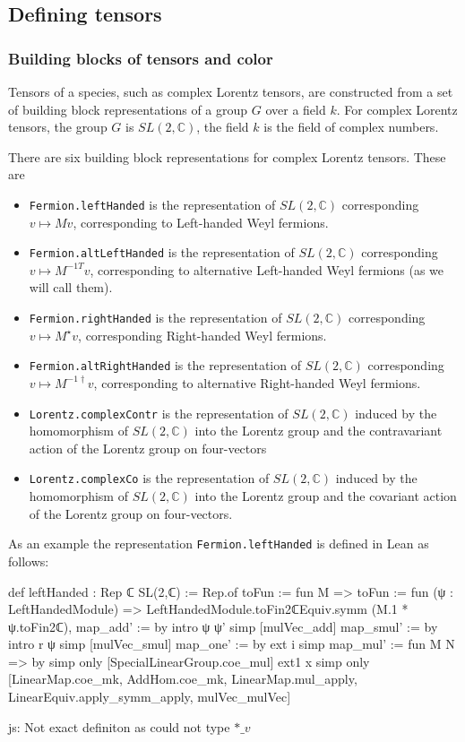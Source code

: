 \documentclass[a4paper, 11pt]{article}
\newcommand{\js}[1]{ {\color{magenta} js:  #1}}
\begin{document}
 \subsection{Defining tensors}

\subsubsection{Building blocks of tensors and color}

Tensors of a species, such as complex Lorentz tensors, are constructed from a 
set of building block representations of a group $G$ over a field $k$.
For complex Lorentz tensors, the group $G$ is $SL(2, \mathbb{C})$, the field $k$ is the 
field of complex numbers. 

There are six building block representations for complex Lorentz tensors. These are
\begin{itemize}
  \item \lstinline|Fermion.leftHanded| is the
   representation of $SL(2, \mathbb{C})$ corresponding 
      $v \mapsto M v$, corresponding to Left-handed Weyl fermions.
  \item \lstinline|Fermion.altLeftHanded| is the
  representation of $SL(2, \mathbb{C})$ corresponding 
     $v \mapsto M^{-1 T} v$, corresponding to alternative Left-handed Weyl fermions (as we will 
     call them).
  \item \lstinline|Fermion.rightHanded| is the representation of $SL(2, \mathbb{C})$ corresponding 
  $v \mapsto M^\star v$, corresponding Right-handed Weyl fermions.
  \item \lstinline|Fermion.altRightHanded| is the representation of $SL(2, \mathbb{C})$ corresponding
  $v \mapsto M^{-1 \dagger} v$, corresponding to alternative Right-handed Weyl fermions.
  \item \lstinline|Lorentz.complexContr| is the representation of $SL(2, \mathbb{C})$ 
   induced by the homomorphism of $SL(2, \mathbb{C})$ into the Lorentz group and the contravariant 
   action of the Lorentz group on four-vectors
  \item \lstinline|Lorentz.complexCo| is the representation of $SL(2, \mathbb{C})$
    induced by the homomorphism of $SL(2, \mathbb{C})$ into the Lorentz group and the covariant
    action of the Lorentz group on four-vectors.
\end{itemize}
As an example the representation \lstinline|Fermion.leftHanded| is defined in Lean as follows:
\begin{code}
def leftHanded : Rep ℂ SL(2,ℂ) := Rep.of {
    toFun := fun M => {
      toFun := fun (ψ : LeftHandedModule) =>
        LeftHandedModule.toFin2ℂEquiv.symm (M.1 * ψ.toFin2ℂ),
      map_add' := by
        intro ψ ψ'
        simp [mulVec_add]
      map_smul' := by
        intro r ψ
        simp [mulVec_smul]}
    map_one' := by
      ext i
      simp
    map_mul' := fun M N => by
      simp only [SpecialLinearGroup.coe_mul]
      ext1 x
      simp only [LinearMap.coe_mk, AddHom.coe_mk, LinearMap.mul_apply, LinearEquiv.apply_symm_apply,
        mulVec_mulVec]}  
\end{code} \js{Not exact definiton as could not type $*\_v$}
\end{document}
